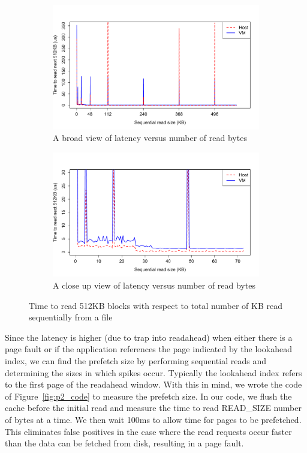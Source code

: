 \begin{figure}[hb!]
	\begin{subfigure}[t]{0.5\textwidth}
	\includegraphics[width=\textwidth]{./figures/p2_big.pdf}
	\caption{A broad view of latency versus number of read bytes}
	\label{fig:p2_graph_big}
	\end{subfigure}
	
	\begin{subfigure}[t]{0.5\textwidth}
	\includegraphics[width=\textwidth]{./figures/p2_small.pdf}
	\caption{A close up view of latency versus number of read bytes}
	\label{fig:p2_graph_small}
	\end{subfigure}
	\caption{Time to read 512KB blocks with respect to total number of KB read sequentially from a file}
\end{figure}

Since the latency is higher (due to trap into readahead) when either there is a page 
fault or if the application references the page indicated by the lookahead index,
we can find the prefetch size by performing sequential reads and determining
the sizes in which spikes occur. Typically the lookahead index refers to the first 
page of the readahead window. With this in mind, we wrote the code of 
Figure~\ref{fig:p2_code} to measure the prefetch size. In our code, we flush 
the cache before the initial read and measure the time to read READ\_SIZE number of
bytes at a time. We then wait 100ms to allow time for pages to be prefetched. This
eliminates false positives in the case where the read requests occur faster than
the data can be fetched from disk, resulting in a page fault.


